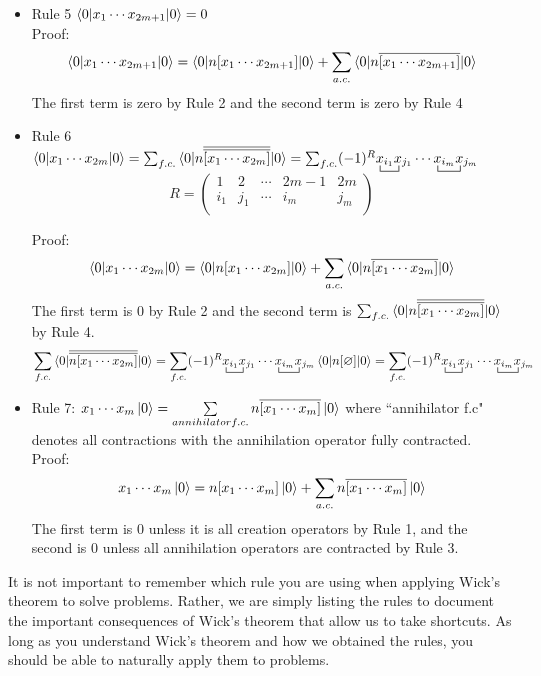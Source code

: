 \documentclass{article}
\newcommand{\ol}{\overline}
\newcommand{\ctr}{\bcontraction}
\newcommand{\cd}{\ensuremath{\cdots} }
\begin{document}
\begin{itemize}
\item Rule 5 $\braket{0 | x_1 \cd x_{2m + 1} | 0} = 0 $ \\

Proof: 
\[\braket{0 | x_1 \cd x_{2m + 1} | 0}   =  \braket{0 | n[x_1 \cd x_{2m + 1}] | 0}  +  \sum_{a.c.} \braket{0 | n\ol{[x_1 \cd x_{2m + 1}]} | 0}  \]
The first term is zero by Rule 2 and the second term is zero by Rule 4

 \item Rule 6 $\braket{0 | x_1 \cd x_{2m } | 0} = \sum_{f.c.} \braket{0 | n\ol{\ol{ [x_1 \cd x_{2m }]}}|0} = \sum_{f.c.} (-1)^R \ctr{}{x}{{}_{i_1}}{x}  x_{i_1} x_{j_1} \cd \ctr{}{x}{{}_{i_m}}{x} x_{i_m} x_{j_m}$\\

\begin{equation*}
R = 
\begin{pmatrix}
1 & 2 &\cd  & 2m - 1 & 2m  \\
i_1 & j_1 & \cd  & i_m & j_m \\
\end{pmatrix}
\end{equation*}

Proof: 
\[\braket{0 | x_1 \cd x_{2m} | 0}   =  \braket{0 | n[x_1 \cd x_{2m}] | 0}  +  \sum_{a.c.} \braket{0 | n\ol{[x_1 \cd x_{2m}]} | 0}  \]
The first term is 0 by Rule 2 and the second term is $ \sum_{f.c.} \braket{0 | n\ol{\ol{ [x_1 \cd x_{2m }]}}|0}$ by Rule 4. 
\[ \sum_{f.c.} \braket{0 | \ol{\ol{ n[x_1 \cd x_{2m }]}}|0} =  \sum_{f.c.} (-1)^R  \ctr{}{x}{{}_{i_1}}{x}  x_{i_1} x_{j_1} \cd \ctr{}{x}{{}_{i_m}}{x} x_{i_m} x_{j_m} \braket{0 | n[\varnothing] | 0} = \sum_{f.c.} (-1)^R \ctr{}{x}{{}_{i_1}}{x}  x_{i_1} x_{j_1} \cd \ctr{}{x}{{}_{i_m}}{x} x_{i_m} x_{j_m} \]

\item Rule 7: $x_1 \cd x_m \ket{0} = \sum\limits_{annihilator f.c.} n\ol{[x_1 \cd x_m] }\ket{0} $
where ``annihilator f.c" denotes all contractions with the annihilation operator fully contracted.\\

Proof: 
\[x_1 \cd x_m \ket{0} = n[x_1 \cd x_m] \ket{0} + \sum_{a.c.} n\ol{[x_1 \cd x_m ]} \ket{0} \]
The first term is 0 unless it is all creation operators by Rule 1, and the second is 0 unless all annihilation operators are contracted by Rule 3. 
\end{itemize}
It is not important to remember which rule you are using when applying Wick's theorem to solve problems. 
Rather, we are simply listing the rules to document the important consequences of Wick's theorem that allow us to take shortcuts.
As long as you understand Wick's theorem and how we obtained the rules, you should be able to naturally apply them to problems. 
\end{document}
